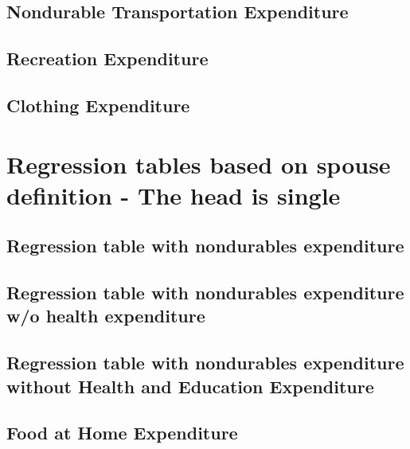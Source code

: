 \documentclass[a4paper,landscape]{article}
\begin{document}
\subsection{Nondurable Transportation Expenditure}

\clearpage

\subsection{Recreation Expenditure}

\clearpage

\subsection{Clothing Expenditure}

\clearpage


\section{Regression tables based on spouse definition - The head is single}

\subsection{Regression table with nondurables expenditure}

\clearpage

\subsection{Regression table with nondurables expenditure w/o health expenditure} 

\clearpage

\subsection{Regression table with nondurables expenditure without Health and Education Expenditure}

\clearpage



\subsection{Food at Home Expenditure}

\clearpage
\end{document}
